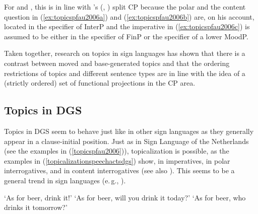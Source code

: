 \noindent For \citet{pfau2008topics} and \citet{aboh2010sa}, this is in line with \citeauthor{rizzi1997fine}'s (\citeyear{rizzi1997fine}, \citeyear{rizzi2001position}) split CP because the polar and the content question in (\ref{ex:topicspfau2006a}) and (\ref{ex:topicspfau2006b}) are, on his account, located in the specifier of InterP and the imperative in (\ref{ex:topicspfau2006c}) is assumed to be either in the specifier of FinP or the specifier of a lower MoodP.

Taken together, research on topics in sign languages has shown that there is a contrast between moved and base-generated topics and that the ordering restrictions of topics and different sentence types are in line with the idea of a (strictly ordered) set of functional projections in the CP area. 

\subsection{Topics in DGS}\label{topicsindgssection}

Topics in DGS seem to behave just like in other sign languages as they generally appear in a clause-initial position. Just as in Sign Language of the Netherlands (see the examples in (\ref{topicspfau2006})), topicalization is possible, as the examples in (\ref{topicalizationspeechactsdgs}) show, in imperatives, in polar interrogatives, and in content interrogatives  (see also \citealt[391]{happ2014vork}). This seems to be a general trend in sign languages (e.\,g., \citealt[24]{zeshan2004interrogative}).  

\begin{exe}
\ex\label{topicalizationspeechactsdgs}\begin{xlist} 
\ex {} 
\glt `As for beer, drink it!' \label{topicalizationspeechactsdgsa}
\ex {} 
%
\glt `As for beer, will you drink it today?' \label{topicalizationspeechactsdgsb}
\ex {} 
\glt `As for beer, who drinks it tomorrow?' \label{topicalizationspeechactsdgsb}
\end{xlist}
\end{exe}

